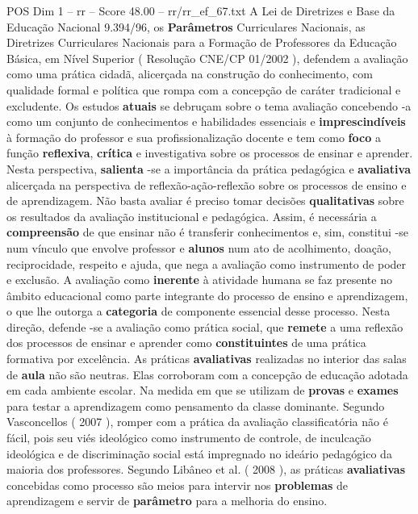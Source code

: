 \begin{textsample}{POS Dim 1 – rr – Score 48.00 – rr/rr\_ef\_67.txt}
A Lei de Diretrizes e Base da Educação Nacional 9.394/96, os \textbf{Parâmetros} Curriculares Nacionais, as Diretrizes Curriculares Nacionais para a Formação de Professores da Educação Básica, em Nível Superior ( Resolução CNE/CP 01/2002 ), defendem a avaliação como uma prática cidadã, alicerçada na construção do conhecimento, com qualidade formal e política que rompa com a concepção de caráter tradicional e excludente.
Os estudos \textbf{atuais} se debruçam sobre o tema avaliação concebendo -a como um conjunto de conhecimentos e habilidades essenciais e \textbf{imprescindíveis} à formação do professor e sua profissionalização docente e tem como \textbf{foco} a função \textbf{reflexiva}, \textbf{crítica} e investigativa sobre os processos de ensinar e aprender.
Nesta perspectiva, \textbf{salienta} -se a importância da prática pedagógica e \textbf{avaliativa} alicerçada na perspectiva de reflexão-ação-reflexão sobre os processos de ensino e de aprendizagem.
Não basta avaliar é preciso tomar decisões \textbf{qualitativas} sobre os resultados da avaliação institucional e pedagógica.
Assim, é necessária a \textbf{compreensão} de que ensinar não é transferir conhecimentos e, sim, constitui -se num vínculo que envolve professor e \textbf{alunos} num ato de acolhimento, doação, reciprocidade, respeito e ajuda, que nega a avaliação como instrumento de poder e exclusão.
A avaliação como \textbf{inerente} à atividade humana se faz presente no âmbito educacional como parte integrante do processo de ensino e aprendizagem, o que lhe outorga a \textbf{categoria} de componente essencial desse processo.
Nesta direção, defende -se a avaliação como prática social, que \textbf{remete} a uma reflexão dos processos de ensinar e aprender como \textbf{constituintes} de uma prática formativa por excelência.
As práticas \textbf{avaliativas} realizadas no interior das salas de \textbf{aula} não são neutras.
Elas corroboram com a concepção de educação adotada em cada ambiente escolar.
Na medida em que se utilizam de \textbf{provas} e \textbf{exames} para testar a aprendizagem como pensamento da classe dominante.
Segundo Vasconcellos ( 2007 ), romper com a prática da avaliação classificatória não é fácil, pois seu viés ideológico como instrumento de controle, de inculcação ideológica e de discriminação social está impregnado no ideário pedagógico da maioria dos professores.
Segundo Libâneo et al. ( 2008 ), as práticas \textbf{avaliativas} concebidas como processo são meios para intervir nos \textbf{problemas} de aprendizagem e servir de \textbf{parâmetro} para a melhoria do ensino.

\end{textsample}
